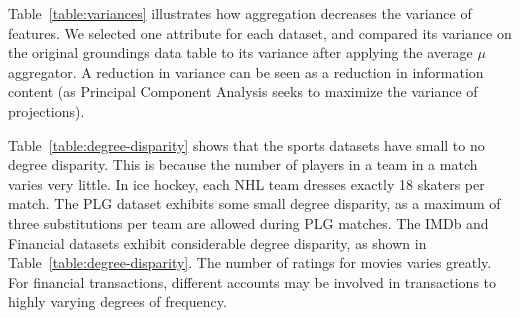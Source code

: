 \documentclass[conference]{IEEEtran}
\begin{document}
Table~\ref{table:variances} illustrates how aggregation decreases the variance of features. We selected one attribute for each dataset, and compared its variance on the original groundings data table to its variance after applying the average $\mu$ aggregator. A reduction in variance can be seen as a reduction in information content (as Principal Component Analysis seeks to maximize the variance of projections).

\begin{table}[ht]
\caption{Feature Variance  vs. Average Feature Variance}
\centering
{}
\label{table:variances}
\end{table}


Table~\ref{table:degree-disparity} shows that the sports datasets have small to no degree disparity. This is because the number of players in a team in a match varies very little. In ice hockey, each NHL team dresses exactly 18 skaters per match.
The PLG dataset exhibits some small degree disparity, as a maximum of three substitutions per team are allowed during PLG matches.  The IMDb and Financial datasets exhibit considerable degree disparity, as shown in Table~\ref{table:degree-disparity}. The number of ratings for movies varies greatly. For financial transactions, different accounts may be involved in transactions to highly varying degrees of frequency.
\end{document}
